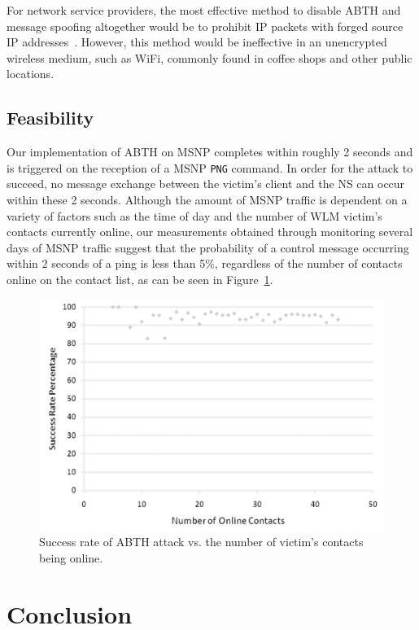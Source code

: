 \documentclass{sig-alternate}
\begin{document}
For network service providers, the most effective method to disable ABTH and message spoofing altogether would be to prohibit IP packets with forged source IP addresses~\cite{templeton:spoof}.
However, this method would be ineffective in an unencrypted wireless medium, such as WiFi, commonly found in coffee shops and other public locations. 

\subsection{Feasibility}
\label{sec:feasibility}

Our implementation of ABTH on MSNP completes within roughly 2 seconds and is triggered on the reception of a MSNP \texttt{PNG} command.
In order for the attack to succeed, no message exchange between the victim's client and the NS can occur within these 2 seconds.
Although the amount of MSNP traffic is dependent on a variety of factors such as the time of day and the number of WLM victim's contacts currently online, our measurements obtained through monitoring several days of MSNP traffic suggest that the probability of a control message occurring within 2 seconds of a ping is less than 5\%, regardless of the number of contacts online on the contact list, as can be seen in Figure~\ref{fig:successrate}.

\begin{figure}[h]
	\centering
	\caption{Success rate of ABTH attack vs. the number of victim's contacts being online.}
	\label{fig:successrate}
	\includegraphics[width=\columnwidth]{graphics/plot}
\end{figure}


\section{Conclusion}
\label{sec:conclusion}
\end{document}
